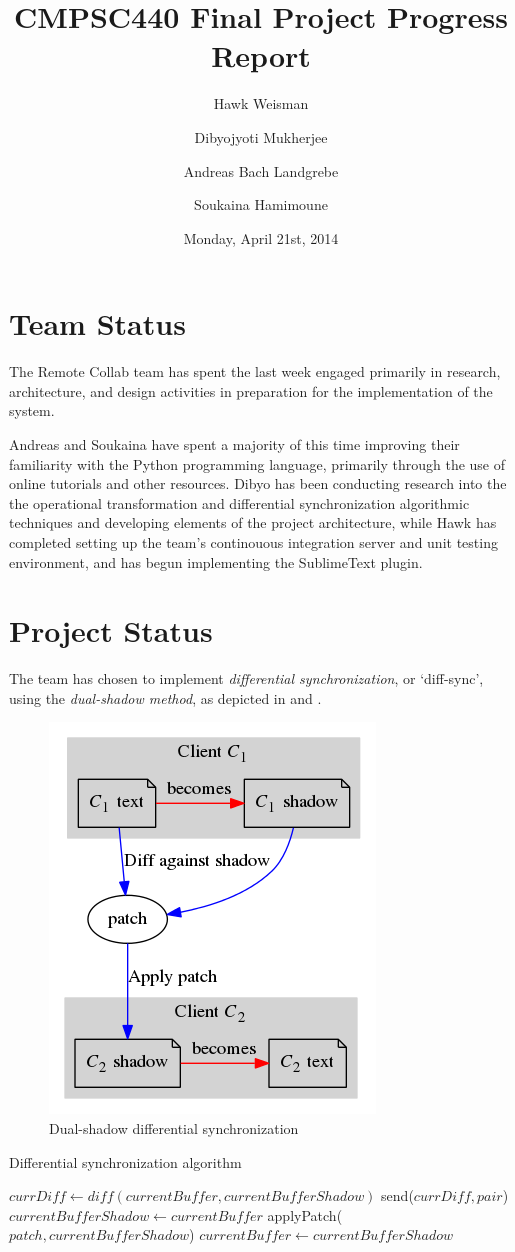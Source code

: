 \documentclass[11pt,english]{article}
\date{Monday, April 21st, 2014}
\title{CMPSC440 Final Project Progress Report}
\author[1]{Hawk Weisman}
\author[1]{Dibyojyoti Mukherjee}
\author[1]{Andreas Bach Landgrebe}
\author[2]{Soukaina Hamimoune}
\affil[1]{Allegheny College, Department of Computer Science}
\affil[2]{Al Akhawayn University, Department of Computer Science}
\begin{document}
	\maketitle
	\section{Team Status}
	The Remote Collab team has spent the last week engaged primarily in research, architecture, and design activities in preparation for the implementation of the system.

	Andreas and Soukaina have spent a majority of this time improving their familiarity with the Python programming language, primarily through the use of online tutorials and other resources. Dibyo has been conducting research into the the operational transformation and differential synchronization algorithmic techniques and developing elements of the project architecture, while Hawk has completed setting up the team's continouous integration server and unit testing environment, and has begun implementing the SublimeText plugin.
	\section{Project Status}
	The team has chosen to implement \textit{differential synchronization}, or `diff-sync', using the \textit{dual-shadow method}, as depicted in  and .
	\begin{figure}
		\centering
		\includegraphics[width=0.5\linewidth]{diffsync.png}
		\caption{Dual-shadow differential synchronization}
		\label{fig:diffsync}
	\end{figure}
	\begin{algorithm}
	\caption{Differential synchronization algorithm}\label{alg:diffsync}
	\begin{algorithmic}[1]
   	\State $currDiff \gets diff(currentBuffer, currentBufferShadow)$
   	\State send($currDiff, pair$)
   	\State $currentBufferShadow \gets currentBuffer$
	\EndProcedure
    	\State applyPatch($patch, currentBufferShadow$)
    	\State $currentBuffer \gets currentBufferShadow$
    \EndProcedure
	\end{algorithmic}
	\end{algorithm}
\end{document}
